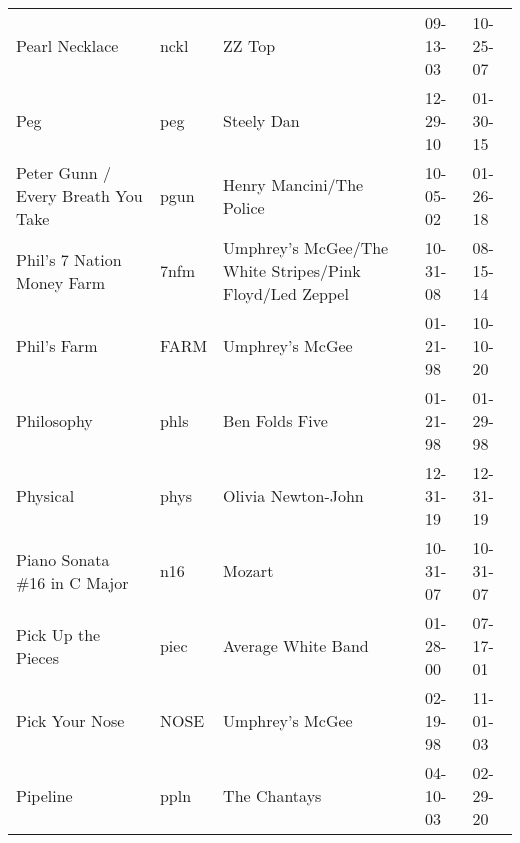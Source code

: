 \begin{longtable}{p{}p{}p{}p{}p{}}
                                                          Pearl Necklace &          nckl &                                                   ZZ Top &              09-13-03 &             10-25-07 \\
                                                                     Peg &           peg &                                               Steely Dan &              12-29-10 &             01-30-15 \\
                                      Peter Gunn / Every Breath You Take &          pgun &                                 Henry Mancini/The Police &              10-05-02 &             01-26-18 \\
                                              Phil's 7 Nation Money Farm &          7nfm &  Umphrey's McGee/The White Stripes/Pink Floyd/Led Zeppel &              10-31-08 &             08-15-14 \\
                                                             Phil's Farm &          FARM &                                          Umphrey's McGee &              01-21-98 &             10-10-20 \\
                                                              Philosophy &          phls &                                           Ben Folds Five &              01-21-98 &             01-29-98 \\
                                                                Physical &          phys &                                       Olivia Newton-John &              12-31-19 &             12-31-19 \\
                                            Piano Sonata \#16 in C Major &           n16 &                                                   Mozart &              10-31-07 &             10-31-07 \\
                                                      Pick Up the Pieces &          piec &                                       Average White Band &              01-28-00 &             07-17-01 \\
                                                          Pick Your Nose &          NOSE &                                          Umphrey's McGee &              02-19-98 &             11-01-03 \\
                                                                Pipeline &          ppln &                                             The Chantays &              04-10-03 &             02-29-20 \\

\end{longtable}
